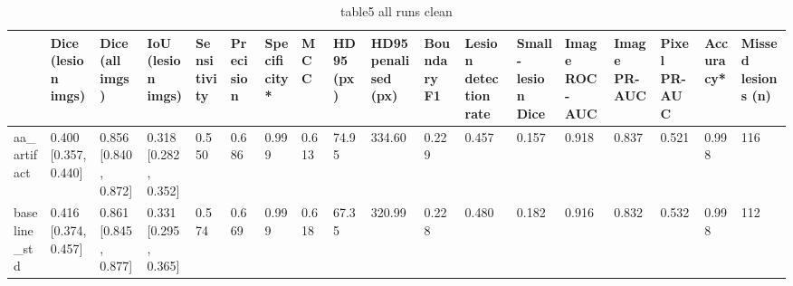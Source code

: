 \begin{table}
\caption{table5 all runs clean}
\label{tab:table5_all_runs_clean}
\begin{tabular}{llllllllllllllllll}
\toprule
 & Dice (lesion imgs) & Dice (all imgs) & IoU (lesion imgs) & Sensitivity & Precision & Specificity* & MCC & HD95 (px) & HD95 penalised (px) & Boundary F1 & Lesion detection rate & Small-lesion Dice & Image ROC-AUC & Image PR-AUC & Pixel PR-AUC & Accuracy* & Missed lesions (n) \\
\midrule
aa\_artifact & 0.400 [0.357, 0.440] & 0.856 [0.840, 0.872] & 0.318 [0.282, 0.352] & 0.550 & 0.686 & 0.999 & 0.613 & 74.95 & 334.60 & 0.229 & 0.457 & 0.157 & 0.918 & 0.837 & 0.521 & 0.998 & 116 \\
baseline\_std & 0.416 [0.374, 0.457] & 0.861 [0.845, 0.877] & 0.331 [0.295, 0.365] & 0.574 & 0.669 & 0.999 & 0.618 & 67.35 & 320.99 & 0.228 & 0.480 & 0.182 & 0.916 & 0.832 & 0.532 & 0.998 & 112 \\
\bottomrule
\end{tabular}
\end{table}
